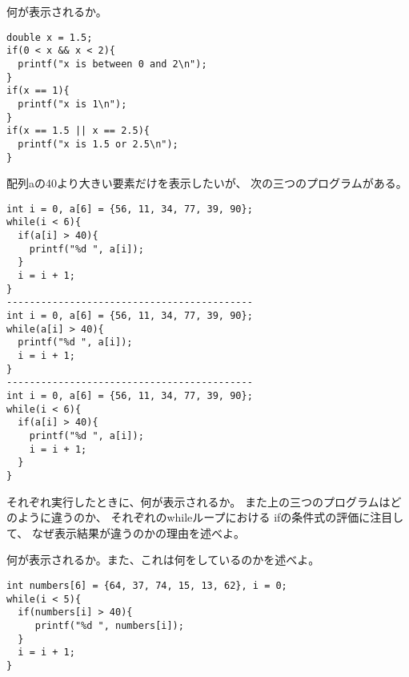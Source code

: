 \documentclass[12pt,a4j]{jarticle}
\newcounter{toi}
\def\toi{%
\bigskip\bigskip\noindent
\addtocounter{toi}{1}
\shadowbox{\bfseries\large 問\thetoi}
\nopagebreak[4]\bigskip\nopagebreak[4]
}
\begin{document}






\toi

何が表示されるか。
\begin{verbatim}
double x = 1.5;
if(0 < x && x < 2){
  printf("x is between 0 and 2\n");
}
if(x == 1){
  printf("x is 1\n");
}
if(x == 1.5 || x == 2.5){
  printf("x is 1.5 or 2.5\n");
}
\end{verbatim}








\toi

配列{\ttfamily a}の40より大きい要素だけを表示したいが、
次の三つのプログラムがある。
\begin{verbatim}
int i = 0, a[6] = {56, 11, 34, 77, 39, 90};
while(i < 6){
  if(a[i] > 40){
    printf("%d ", a[i]);
  }
  i = i + 1;
}
-------------------------------------------
int i = 0, a[6] = {56, 11, 34, 77, 39, 90};
while(a[i] > 40){
  printf("%d ", a[i]);
  i = i + 1;
}
-------------------------------------------
int i = 0, a[6] = {56, 11, 34, 77, 39, 90};
while(i < 6){
  if(a[i] > 40){
    printf("%d ", a[i]);
    i = i + 1;
  }
}
\end{verbatim}
それぞれ実行したときに、何が表示されるか。
また上の三つのプログラムはどのように違うのか、
それぞれの{\ttfamily while}ループにおける
{\ttfamily if}の条件式の評価に注目して、
なぜ表示結果が違うのかの理由を述べよ。






\toi

何が表示されるか。また、これは何をしているのかを述べよ。
\begin{verbatim}
int numbers[6] = {64, 37, 74, 15, 13, 62}, i = 0;
while(i < 5){
  if(numbers[i] > 40){
     printf("%d ", numbers[i]);
  }
  i = i + 1;
}
\end{verbatim}

\end{document}
